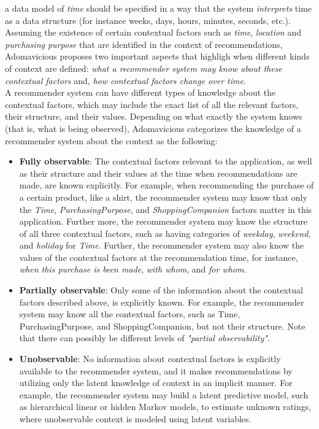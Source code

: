 a data model of \textit{time} should be specified in a way that the system
\textit{interprets} time as a data structure (for instance weeks, 
days, hours, minutes, seconds, etc.). \\
Assuming the existence of certain contextual factors such as
\textit{time}, \textit{location} and \textit{purchasing purpose} that
are identified in the context of recommendations,
Adomavicious  \cite{adomavicius2011context} proposes two important
aspects that highligh when different kinds of context are defined:
\textit{what a recommender system may know about these contextual
factors} and, \textit{how contextual factors change over time}.\\
A recommender system can have different types of knowledge 
about the contextual factors, which may
include the exact list of all the relevant factors, their structure,
and their values. Depending on what
exactly the system knows (that  is, what is being observed),
Adomavicious categorizes the knowledge of a recommender system about
the context as the following:
	\begin{itemize}
	\item \textbf{Fully observable}: The contextual factors relevant to the 
	application, as well as their structure and their values at the time when 
	recommendations are made, are known explicitly. For example, when
	recommending the purchase of a certain product, like a shirt, the 
	recommender system may know that only the \textit{Time}, \textit{PurchasingPurpose}, 
	and \textit{ShoppingCompanion} factors matter in this application. Further more, 
	the recommender system may know the structure of all three contextual 
	factors, such as having categories of \textit{weekday}, \textit{weekend}, 
	and \textit{holiday} for \textit{Time}. Further, the recommender system 
	may also know the values of the contextual factors at the recommendation 
	time, for instance, \textit{when this purchase is been made}, 
	\textit{with whom}, and \textit{for whom}.
	\item \textbf{Partially observable}: Only some of the information about 
	the contextual factors described above, is explicitly known. For example, 
	the recommender system may know all the contextual factors, such as Time, 
	PurchasingPurpose, and ShoppingCompanion, but not their structure. Note that 
	there can possibly be different levels of \textit{"partial observability"}. 
	\item \textbf{Unobservable}: No information about contextual factors is 
	explicitly available to the recommender system, and it makes recommendations 
	by utilizing only the latent knowledge of context in an implicit manner. 
	For example, the recommender system may build a latent predictive model, 
	such as hierarchical linear or hidden Markov models, to estimate unknown 
	ratings, where unobservable context is modeled using latent variables.
	\end{itemize}

